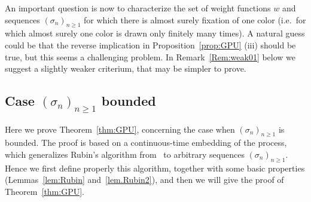 \documentclass[11pt]{article}
\newcommand{\1}{{\text{\Large $\mathfrak 1$}}}
\begin{document}
An important question is now to characterize the set of weight functions $w$ and sequences $(\sigma_n)_{n\ge 1}$ for which there is almost surely fixation of one color (i.e.~for which almost surely one color is drawn only finitely many times). 
A natural guess could be that the reverse implication in Proposition~\ref{prop:GPU} (iii) should be true, but this seems a challenging problem. In Remark~\ref{Rem:weak01} below we suggest 
a slightly weaker criterium, that may be  simpler to prove.   

\subsection{Case $(\sigma_n)_{n\ge 1}$ bounded}  \label{sec:GPU2}
Here we prove Theorem~\ref{thm:GPU}, concerning the case when $(\sigma_n)_{n\ge 1}$ is bounded. 
The proof is based on a continuous-time embedding of the process, which generalizes Rubin's algorithm from~\cite{Dav} to arbitrary sequences $(\sigma_n)_{n\ge 1}$. Hence we first define properly 
this algorithm, together with some basic properties (Lemmas~\ref{lem:Rubin} and~\ref{lem.Rubin2}), and then we will give the proof of Theorem~\ref{thm:GPU}. 
\end{document}
